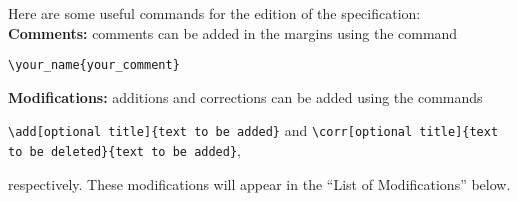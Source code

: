Here are some useful commands for the edition of the specification:\\

\noindent\textbf{Comments:} comments can be added in the margins using the command
\begin{center}
    \Verb|\your_name{your_comment}|
\end{center}

\noindent\textbf{Modifications:} additions and corrections can be added using the commands
\begin{center}
\Verb|\add[optional title]{text to be added}| and \Verb|\corr[optional title]{text to be deleted}{text to be added}|,
\end{center}

\noindent respectively.
These modifications will appear in the ``List of Modifications'' below.\\

\begingroup
    \let\cleardoublepage\relax
    \listofmodification
\endgroup
\newpage

